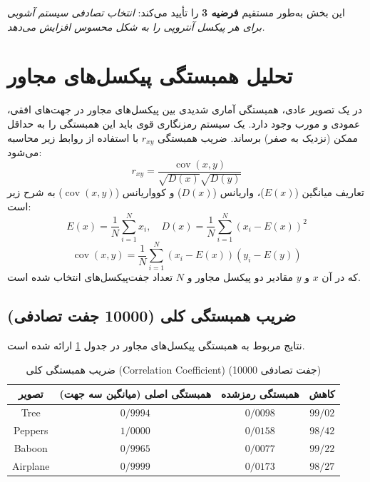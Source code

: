 \documentclass[a4paper,12pt]{report}
\renewcommand{\%}{\lr{\oldpercent}}
\providecommand{\lr}[1]{#1}
\begin{document}
این بخش به‌طور مستقیم \textbf{فرضیه 3} را تأیید می‌کند: \textit{انتخاب تصادفی سیستم آشوبی برای هر پیکسل آنتروپی را به شکل محسوس افزایش می‌دهد.}

\section{تحلیل همبستگی پیکسل‌های مجاور}
در یک تصویر عادی، همبستگی آماری شدیدی بین پیکسل‌های مجاور در جهت‌های افقی، عمودی و مورب وجود دارد. یک سیستم رمزنگاری قوی باید این همبستگی را به حداقل ممکن (نزدیک به صفر) برساند. ضریب همبستگی $r_{xy}$ با استفاده از روابط زیر محاسبه می‌شود:
\begin{equation} \label{eq:corr_ch4}
r_{xy} = \frac{\operatorname{cov}(x,y)}{\sqrt{D(x)} \sqrt{D(y)}}
\end{equation}
تعاریف میانگین ($E(x)$)، واریانس ($D(x)$) و کوواریانس ($\operatorname{cov}(x,y)$) به شرح زیر است:
\begin{equation} \label{eq:corr_details_ch4}
E(x) = \frac{1}{N} \sum_{i=1}^N x_i, \quad D(x) = \frac{1}{N} \sum_{i=1}^N (x_i - E(x))^2
\end{equation}
\begin{equation} \label{eq:cov_ch4}
\operatorname{cov}(x,y) = \frac{1}{N} \sum_{i=1}^N (x_i - E(x))(y_i - E(y))
\end{equation}
که در آن $x$ و $y$ مقادیر دو پیکسل مجاور و $N$ تعداد جفت‌پیکسل‌های انتخاب شده است.

\subsection{ضریب همبستگی کلی (10000 جفت تصادفی)}
نتایج مربوط به همبستگی پیکسل‌های مجاور در جدول \ref{tab:correlation_results} ارائه شده است.

\begin{table}[h]
\centering
\caption{ضریب همبستگی کلی (\lr{Correlation Coefficient}) (10000 جفت تصادفی)} \label{tab:correlation_results}
\begin{tabular}{|c|c|c|c|}
\hline
\textbf{تصویر} & \textbf{همبستگی اصلی (میانگین سه جهت)} & \textbf{همبستگی رمزشده} & \textbf{کاهش} \\ \hline
\lr{Tree} & $0/9994$ & $0/0098$ & $99/02$\% \\ \hline
\lr{Peppers} & $1/0000$ & $0/0158$ & $98/42$\% \\ \hline
\lr{Baboon} & $0/9965$ & $0/0077$ & $99/22$\% \\ \hline
\lr{Airplane} & $0/9999$ & $0/0173$ & $98/27$\% \\ \hline
\end{tabular}
\end{table}
\end{document}
